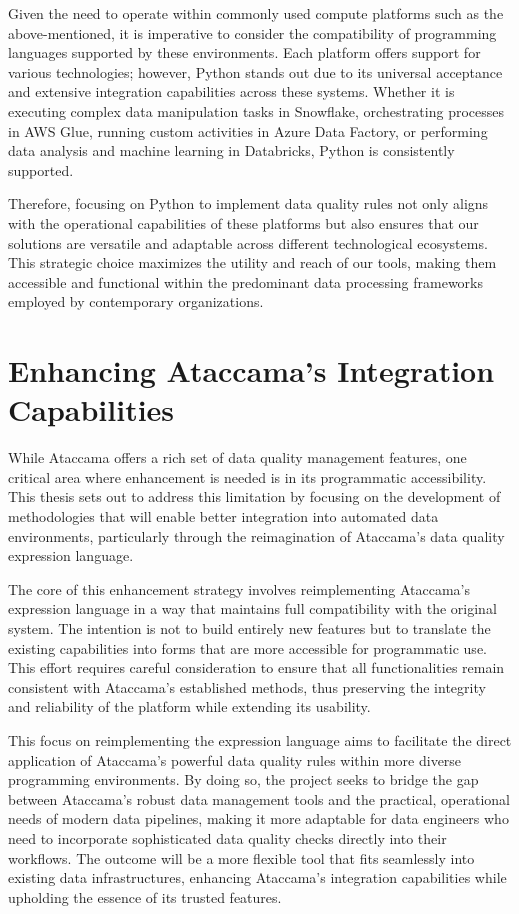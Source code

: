 Given the need to operate within commonly used compute platforms such as the above-mentioned, it is imperative to consider the compatibility of programming languages supported by these environments. Each platform offers support for various technologies; however, Python stands out due to its universal acceptance and extensive integration capabilities across these systems. Whether it is executing complex data manipulation tasks in Snowflake, orchestrating  processes in AWS Glue, running custom activities in Azure Data Factory, or performing data analysis and machine learning in Databricks, Python is consistently supported. 

Therefore, focusing on Python to implement data quality rules not only aligns with the operational capabilities of these platforms but also ensures that our solutions are versatile and adaptable across different technological ecosystems. This strategic choice maximizes the utility and reach of our  tools, making them accessible and functional within the predominant data processing frameworks employed by contemporary organizations.

\section{Enhancing Ataccama's Integration Capabilities}

While Ataccama offers a rich set of data quality management features, one critical area where enhancement is needed is in its programmatic accessibility. This thesis sets out to address this limitation by focusing on the development of methodologies that will enable better integration into automated data environments, particularly through the reimagination of Ataccama’s data quality expression language.

The core of this enhancement strategy involves reimplementing Ataccama's expression language in a way that maintains full compatibility with the original system. The intention is not to build entirely new features but to translate the existing capabilities into forms that are more accessible for programmatic use. This effort requires careful consideration to ensure that all functionalities remain consistent with Ataccama’s established methods, thus preserving the integrity and reliability of the platform while extending its usability.

This focus on reimplementing the expression language aims to facilitate the direct application of Ataccama's powerful data quality rules within more diverse programming environments. By doing so, the project seeks to bridge the gap between Ataccama’s robust data management tools and the practical, operational needs of modern data pipelines, making it more adaptable for data engineers who need to incorporate sophisticated data quality checks directly into their workflows. The outcome will be a more flexible tool that fits seamlessly into existing data infrastructures, enhancing Ataccama’s integration capabilities while upholding the essence of its trusted features.


